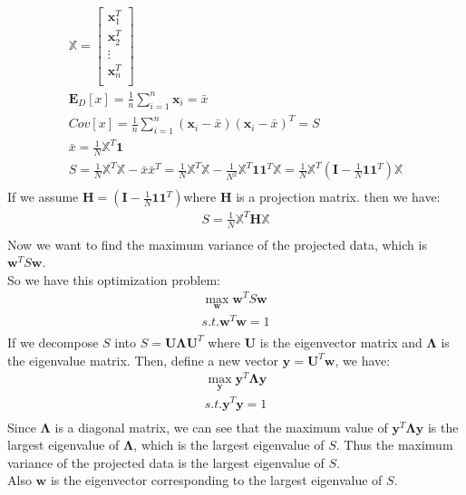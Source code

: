\documentclass[12pt]{article}
\begin{document}
\begin{qsolve}
    \begin{gather*}
        \mathbb{X} = \begin{bmatrix}
            \mathbf{x}_1^T \\
            \mathbf{x}_2^T \\
            \vdots         \\
            \mathbf{x}_n^T \\
        \end{bmatrix} \\
        \mathbf{E}_D [x] = \frac{1}{n} \sum_{i=1}^n \mathbf{x}_i =\bar{x}\\
        Cov[x] = \frac{1}{n} \sum_{i=1}^n (\mathbf{x}_i - \bar{x})(\mathbf{x}_i - \bar{x})^T = S \\
        \bar{x} = \frac{1}{N} \mathbb{X}^T \mathbf{1} \\
        S = \frac{1}{N} \mathbb{X}^T \mathbb{X} - \bar{x} \bar{x}^T = \frac{1}{N} \mathbb{X}^T \mathbb{X} - \frac{1}{N^2} \mathbb{X}^T \mathbf{1} \mathbf{1}^T \mathbb{X} = \frac{1}{N} \mathbb{X}^T (\mathbf{I} - \frac{1}{N} \mathbf{1} \mathbf{1}^T) \mathbb{X} \\
    \end{gather*}
    If we assume $\mathbf{H} = (\mathbf{I} - \frac{1}{N} \mathbf{1} \mathbf{1}^T)$where $\mathbf{H}$ is a projection matrix. then we have:
    \begin{gather*}
        S = \frac{1}{N} \mathbb{X}^T \mathbf{H} \mathbb{X} \\
    \end{gather*}
    Now we want to find the maximum variance of the projected data, which is $\mathbf{w}^T S \mathbf{w} $.\\
    So we have this optimization problem:
    \begin{gather*}
        \max_{\mathbf{w}} \mathbf{w}^T S \mathbf{w} \\
        s.t. \mathbf{w}^T \mathbf{w} = 1 \\
    \end{gather*}
    \splitqsolve
    If we decompose $S$ into $S = \mathbf{U} \mathbf{\Lambda} \mathbf{U}^T$ where $\mathbf{U}$ is the eigenvector matrix and $\mathbf{\Lambda}$ is the eigenvalue matrix. Then, define a new vector $\mathbf{y} = \mathbf{U}^T \mathbf{w}$, we have:
    \begin{gather*}
        \max_{\mathbf{y}} \mathbf{y}^T \mathbf{\Lambda} \mathbf{y} \\
        s.t. \mathbf{y}^T \mathbf{y} = 1 \\
    \end{gather*}
    Since $\mathbf{\Lambda}$ is a diagonal matrix, we can see that the maximum value of $\mathbf{y}^T \mathbf{\Lambda} \mathbf{y}$ is the largest eigenvalue of $\mathbf{\Lambda}$, which is the largest eigenvalue of $S$. Thus the maximum variance of the projected data is the largest eigenvalue of $S$.\\
    Also $\mathbf{w}$ is the eigenvector corresponding to the largest eigenvalue of $S$.
\end{qsolve}
\end{document}
